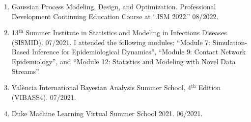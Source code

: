 \documentclass[10pt, ]{article}
\begin{document}
\begin{enumerate}[noitemsep, topsep=0pt]
		\item Gaussian Process Modeling, Design, and Optimization. Professional Development Continuing Education Course at ``JSM 2022.'' 08/2022.
		
		\item 13${}^{\text{th}}$ Summer Institute in Statistics and Modeling in Infectious Diseases (SISMID). 07/2021. I attended the following modules: ``Module 7: Simulation-Based Inference for Epidemiological Dynamics'', ``Module 9: Contact Network Epidemiology'', and ``Module 12: Statistics and Modeling with Novel Data Streams''.
		
		\item València International Bayesian Analysis Summer School, 4${}^{\text{th}}$ Edition (VIBASS4). 07/2021.
		
		\item Duke Machine Learning Virtual Summer School 2021. 06/2021.
	\end{enumerate}
	
	\vspace{10pt}

%	
%		
	
\end{document}
